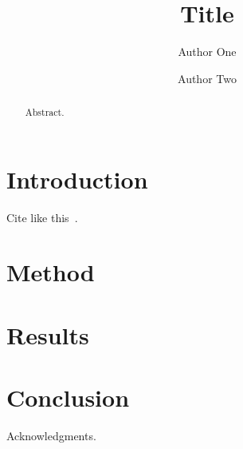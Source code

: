 \documentclass[aps,prl,twocolumn,superscriptaddress,showpacs]{revtex4-2}
\begin{document}
\title{Title}
\author{Author One}
\author{Author Two}
\begin{abstract}
Abstract.
\end{abstract}
\maketitle
\section{Introduction}
Cite like this~\cite{example2026}.
\section{Method}
\section{Results}
\section{Conclusion}
\begin{acknowledgments}
Acknowledgments.
\end{acknowledgments}

\end{document}
